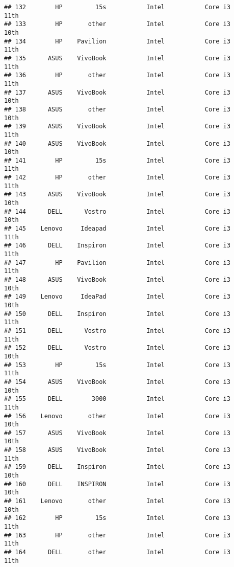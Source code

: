 \documentclass[
]{article}
\begin{document}
\begin{verbatim}
## 132        HP         15s           Intel           Core i3            11th
## 133        HP       other           Intel           Core i3            10th
## 134        HP    Pavilion           Intel           Core i3            11th
## 135      ASUS    VivoBook           Intel           Core i3            11th
## 136        HP       other           Intel           Core i3            11th
## 137      ASUS    VivoBook           Intel           Core i3            10th
## 138      ASUS       other           Intel           Core i3            10th
## 139      ASUS    VivoBook           Intel           Core i3            11th
## 140      ASUS    VivoBook           Intel           Core i3            10th
## 141        HP         15s           Intel           Core i3            11th
## 142        HP       other           Intel           Core i3            11th
## 143      ASUS    VivoBook           Intel           Core i3            10th
## 144      DELL      Vostro           Intel           Core i3            10th
## 145    Lenovo     Ideapad           Intel           Core i3            11th
## 146      DELL    Inspiron           Intel           Core i3            11th
## 147        HP    Pavilion           Intel           Core i3            11th
## 148      ASUS    VivoBook           Intel           Core i3            10th
## 149    Lenovo     IdeaPad           Intel           Core i3            10th
## 150      DELL    Inspiron           Intel           Core i3            11th
## 151      DELL      Vostro           Intel           Core i3            11th
## 152      DELL      Vostro           Intel           Core i3            10th
## 153        HP         15s           Intel           Core i3            11th
## 154      ASUS    VivoBook           Intel           Core i3            10th
## 155      DELL        3000           Intel           Core i3            11th
## 156    Lenovo       other           Intel           Core i3            10th
## 157      ASUS    VivoBook           Intel           Core i3            10th
## 158      ASUS    VivoBook           Intel           Core i3            11th
## 159      DELL    Inspiron           Intel           Core i3            10th
## 160      DELL    INSPIRON           Intel           Core i3            10th
## 161    Lenovo       other           Intel           Core i3            10th
## 162        HP         15s           Intel           Core i3            11th
## 163        HP       other           Intel           Core i3            11th
## 164      DELL       other           Intel           Core i3            11th

\end{verbatim}
\end{document}

